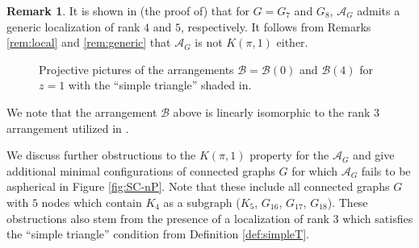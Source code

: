 \documentclass[12pt]{amsart}
\newcommand\CA{{\mathscr A}}
\newcommand\CB{{\mathscr B}}
\numberwithin{equation}{section}
\theoremstyle{plain}
\theoremstyle{definition}
\newtheorem{remark}[equation]{Remark}
\begin{document}
\begin{remark}
	\label{rem:g7g8}
	It is shown in (the proof of) \cite[ Prop.~3.1]{mueckschroehrlewiesner} that for $G = G_7$ and $G_8$, $\CA_G$ admits a generic localization of rank $4$ and $5$, respectively. It follows from Remarks \ref{rem:local}  and \ref{rem:generic} that $\CA_G$ is not $K(\pi,1)$ either.
\end{remark}


\begin{figure}[h]
  \quad
        \caption{Projective pictures of the arrangements $\CB=\CB(0)$ and $\CB(4)$ for $z=1$ with the ``simple triangle'' shaded in.}
        \label{fig:SimpT_G1}
\end{figure}

We note that the arrangement $\CB$ above is linearly isomorphic to the rank $3$ arrangement utilized in 
\cite[Lem.~2.1]{amendmoellerroehrle:aspherical}.



We discuss further obstructions to the $K(\pi,1)$ property for the $\CA_G$ and give 
additional minimal configurations of connected graphs $G$ for which $\CA_G$ fails to be aspherical in Figure \ref{fig:SC-nP}.
Note that these include all connected graphs $G$ with $5$ nodes which contain $K_4$ as a subgraph ($K_5$, $G_{16}$, $G_{17}$, $G_{18}$). These obstructions also stem from the presence of a
localization of rank $3$ which satisfies
the ``simple triangle'' condition from Definition \ref{def:simpleT}.
\end{document}
